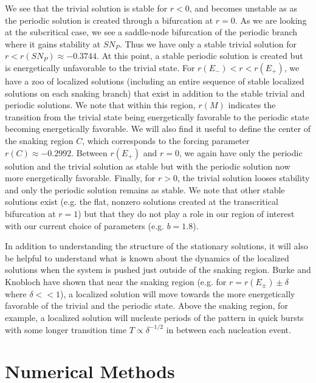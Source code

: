 \documentclass[pre,preprint,superscriptaddress]{revtex4-1}
\begin{document}
We see that the trivial solution is stable for $r<0$, and becomes unstable as as the periodic solution is created through a bifurcation at $r=0$.  As we are looking at the subcritical case, we see a saddle-node bifurcation of the periodic branch where it gains stability at $SN_P$.  Thus we have only a stable trivial solution for $r<r(SN_P)\approx -0.3744$. At this point, a stable periodic solution is created but is energetically unfavorable to the trivial state.  For $r(E_-)<r<r(E_+)$, we have a zoo of localized solutions (including an entire sequence of stable localized solutions on each snaking branch) that exist in addition to the stable trivial and periodic solutions.  We note that within this region, $r(M)$ indicates the transition from the trivial state being energetically favorable to the periodic state becoming energetically favorable.  We will also find it useful to define the center of the snaking region $C$, which corresponds to  the forcing parameter $r(C)\approx -0.2992$.  Between $r(E_+)$ and $r=0$, we again have only the periodic solution and the trivial solution as stable  but with the periodic solution now more energetically favorable.   Finally, for $r>0$, the trivial solution looses stability and only the periodic solution remains as stable.  We note that other stable solutions exist (e.g. the flat, nonzero solutions created at the transcritical bifurcation at $r=1$) but that they do not play a role in our region of interest with our current choice of parameters (e.g. $b=1.8$).

In addition to understanding the structure of the stationary solutions, it will also be helpful to understand what is known about the dynamics of the localized solutions when the system is pushed just outside of the snaking region.  Burke and Knobloch \cite{burke2006} have shown that near the snaking region (e.g. for $r=r(E_{\pm})\pm\delta$ where $\delta <<1$), a localized solution will move towards the more energetically favorable of the trivial and the periodic state.  Above the snaking region, for example, a localized solution will nucleate periods of the pattern in quick bursts with some longer transition time $T\propto \delta^{-1/2}$ in between each nucleation event. 

\section{Numerical Methods}
\end{document}
